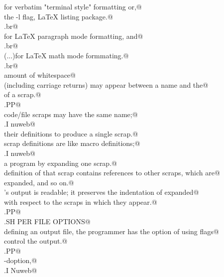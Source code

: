 \documentclass[a4paper]{report}
\begin{document}
\begin{flushleft}
\begin{list}{}{}
\mbox{}\verb@{}\fP for verbatim "terminal style" formatting or,@\\
\mbox{}\verb@with the -l flag, LaTeX listing package.@\\
\mbox{}\verb@.br@\\
\mbox{}\verb@{}\verb@[\fP...\fB@{\tt @}\verb@]\fP for LaTeX paragraph mode formatting, and@\\
\mbox{}\verb@.br@\\
\mbox{}\verb@{}\verb@(\fP...\verb@)\fP for LaTeX math mode formmating.@\\
\mbox{}\verb@.br@\\
\mbox{}\verb@Any amount of whitespace@\\
\mbox{}\verb@(including carriage returns) may appear between a name and the@\\
\mbox{}\verb@begining of a scrap.@\\
\mbox{}\verb@.PP@\\
\mbox{}\verb@Several code/file scraps may have the same name;@\\
\mbox{}\verb@.I nuweb@\\
\mbox{}\verb@concatenates their definitions to produce a single scrap.@\\
\mbox{}\verb@Code scrap definitions are like macro definitions;@\\
\mbox{}\verb@.I nuweb@\\
\mbox{}\verb@extracts a program by expanding one scrap.@\\
\mbox{}\verb@The definition of that scrap contains references to other scraps, which are@\\
\mbox{}\verb@themselves expanded, and so on.@\\
\mbox{}\verb@\fINuweb\fP's output is readable; it preserves the indentation of expanded@\\
\mbox{}\verb@scraps with respect to the scraps in which they appear.@\\
\mbox{}\verb@.PP@\\
\mbox{}\verb@.SH PER FILE OPTIONS@\\
\mbox{}\verb@When defining an output file, the programmer has the option of using flags@\\
\mbox{}\verb@to control the output.@\\
\mbox{}\verb@.PP@\\
\mbox{}\verb@\fB-d\fR option,@\\
\mbox{}\verb@.I Nuweb@\\

\end{list}
\end{flushleft}
\end{document}

